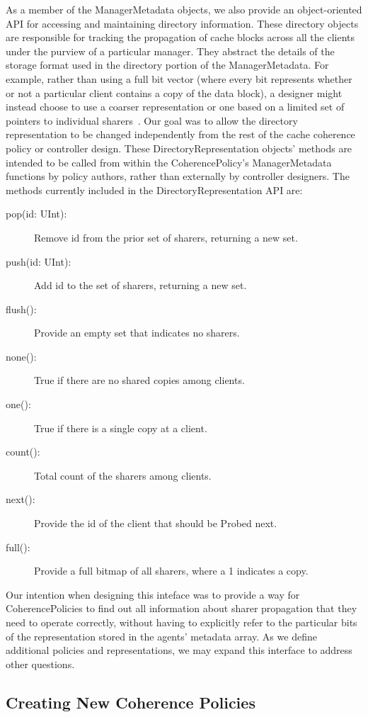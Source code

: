 As a member of the ManagerMetadata objects,
we also provide an object-oriented API for accessing and maintaining directory information.
These directory objects are responsible for tracking the propagation of cache blocks
across all the clients under the purview of a particular manager.
They abstract the details of the storage format used in the directory portion of the ManagerMetadata.
For example, rather than using a full bit vector (where every bit represents whether or not a particular client contains a copy of the data block),
a designer might instead choose to use a coarser representation
or one based on a limited set of pointers to individual sharers~\cite{sorin2011primer}.
Our goal was to allow the directory representation to be changed independently from
the rest of the cache coherence policy or controller design.
These DirectoryRepresentation objects' methods are intended to be called
from within the CoherencePolicy's ManagerMetadata functions by policy authors,
rather than externally by controller designers.
The methods currently included in the DirectoryRepresentation API are:
\begin{description}
\item[pop(id: UInt):] Remove id from the prior set of sharers, returning a new set.
\item[push(id: UInt):] Add id to the set of sharers, returning a new set.
\item[flush():] Provide an empty set that indicates no sharers.
\item[none():] True if there are no shared copies among clients.
\item[one():] True if there is a single copy at a client.
\item[count():] Total count of the sharers among clients.
\item[next():] Provide the id of the client that should be Probed next.
\item[full():] Provide a full bitmap of all sharers, where a 1 indicates a copy.
\end{description}

Our intention when designing this inteface was to provide a way for CoherencePolicies
to find out all information about sharer propagation that they need to operate correctly,
without having to explicitly refer to the particular bits of the representation
stored in the agents' metadata array.
As we define additional policies and representations,
we may expand this interface to address other questions.

\subsection{Creating New Coherence Policies}

